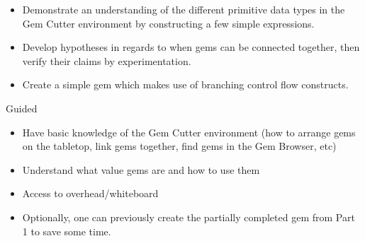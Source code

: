 
	{
		\begin{itemize}
			\item Demonstrate an understanding of the different primitive data types in the Gem Cutter environment by constructing a few simple expressions.
			\item Develop hypotheses in regards to when gems can be connected together, then verify their claims by experimentation.
			\item Create a simple gem which makes use of branching control flow constructs.
		\end{itemize}
	}
	{Guided}
	{
		\begin{itemize}
			\item Have basic knowledge of the Gem Cutter environment (how to arrange gems on the tabletop, link gems together, find gems in the Gem Browser, etc)
			\item Understand what value gems are and how to use them
		\end{itemize}
	}
	{
		\begin{itemize}
			\item Access to overhead/whiteboard
			\item Optionally, one can previously create the partially completed gem from Part 1 to save some time.
		\end{itemize}
	}
